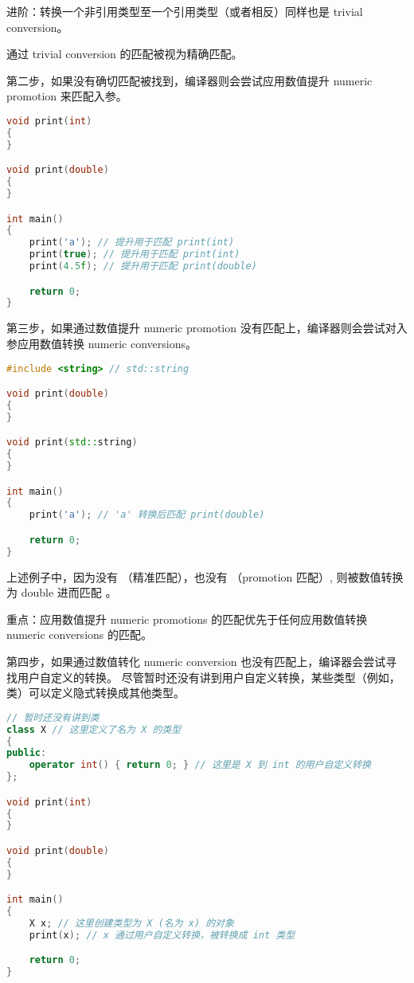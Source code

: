 \documentclass[../../LearnCpp.tex]{subfiles}
\begin{document}
进阶：转换一个非引用类型至一个引用类型（或者相反）同样也是 trivial conversion。

通过 trivial conversion 的匹配被视为精确匹配。

第二步，如果没有确切匹配被找到，编译器则会尝试应用数值提升 numeric promotion 来匹配入参。

\begin{lstlisting}[language=C++]
void print(int)
{
}

void print(double)
{
}

int main()
{
    print('a'); // 提升用于匹配 print(int)
    print(true); // 提升用于匹配 print(int)
    print(4.5f); // 提升用于匹配 print(double)

    return 0;
}
\end{lstlisting}

第三步，如果通过数值提升 numeric promotion 没有匹配上，编译器则会尝试对入参应用数值转换 numeric conversions。

\begin{lstlisting}[language=C++]
#include <string> // std::string

void print(double)
{
}

void print(std::string)
{
}

int main()
{
    print('a'); // 'a' 转换后匹配 print(double)

    return 0;
}
\end{lstlisting}

上述例子中，因为没有 （精准匹配），也没有 （promotion 匹配）,
 则被数值转换为 double 进而匹配 。

重点：应用数值提升 numeric promotions 的匹配优先于任何应用数值转换 numeric conversions 的匹配。

第四步，如果通过数值转化 numeric conversion 也没有匹配上，编译器会尝试寻找用户自定义的转换。
尽管暂时还没有讲到用户自定义转换，某些类型（例如，类）可以定义隐式转换成其他类型。

\begin{lstlisting}[language=C++]
// 暂时还没有讲到类
class X // 这里定义了名为 X 的类型
{
public:
    operator int() { return 0; } // 这里是 X 到 int 的用户自定义转换
};

void print(int)
{
}

void print(double)
{
}

int main()
{
    X x; // 这里创建类型为 X (名为 x) 的对象
    print(x); // x 通过用户自定义转换，被转换成 int 类型

    return 0;
}
\end{lstlisting}
\end{document}
